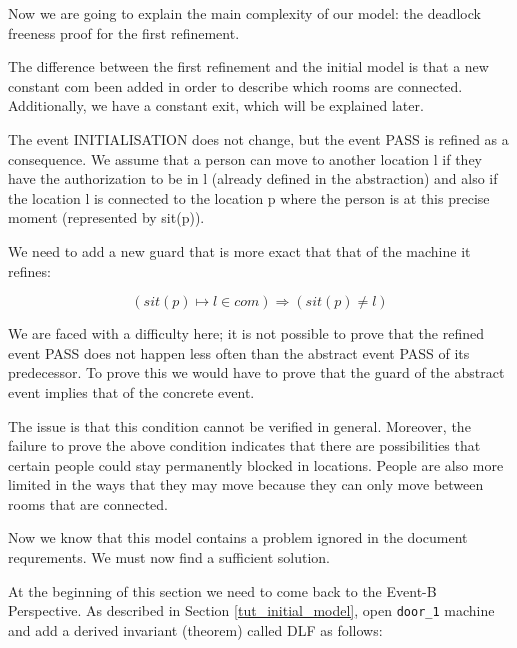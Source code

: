 Now we are going to explain the main complexity of our model: the deadlock freeness proof for the first refinement. 

The difference between the first refinement and the initial model is that a new constant \textsf{com} been added in order to describe which rooms are connected. Additionally, we have a constant \textsf{exit}, which will be explained later. 

The event \textsf{INITIALISATION} does not change, but the event \textsf{PASS} is refined as a consequence. We assume that a person can move to another location l if they have the authorization to be in l (already defined in the abstraction) and also if the location l is connected to the location p where the person is at this precise moment (represented by sit(p)).

We need to add a new guard that is more exact that that of the machine it refines:

\[
( sit(p) \mapsto l \in com ) \Rightarrow ( sit(p)\neq l )
\]

We are faced with a difficulty here; it is not possible to prove that the refined event \textsf{PASS} does not happen less often than the abstract event \textsf{PASS} of its predecessor. To prove this we would have to prove that the guard of the abstract event implies that of the concrete event.

The issue is that this condition cannot be verified in general. Moreover, the failure to prove the above condition indicates that there are possibilities that certain people could stay permanently blocked in locations. People are also more limited in the ways that they may move because they can only move between rooms that are connected.

Now we know that this model contains a problem ignored in the document requrements. We must now find a sufficient solution.


At the beginning of this section we need to come back to the \textsf{Event-B Perspective}. As described in Section \ref{tut_initial_model}, open \texttt{door\_1} machine and add a derived invariant (theorem) called \textsf{DLF} as follows: 

\begin{description}
\INVARIANTS
	\begin{description}
	\end{description}
\end{description}


